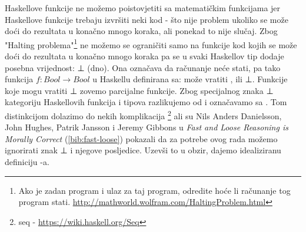   Haskellove funkcije ne možemo poistovjetiti sa matematičkim funkcijama jer
  Haskellove funkcije trebaju izvršiti neki kod - što nije problem ukoliko se
  može doći do rezultata u konačno mnogo koraka, ali ponekad to nije slučaj. Zbog "Halting
  problema"\footnote{Ako je zadan program i ulaz za taj program, odredite hoće
    li računanje tog program stati.
    \url{http://mathworld.wolfram.com/HaltingProblem.html}} ne možemo se
  ograničiti samo na funkcije kod kojih se može doći do rezultata u konačno
  mnogo koraka pa se u svaki Haskellov tip dodaje posebna vrijednost: ⊥ (dno).
  Ona označava da računanje neće stati, pa tako funkcija $f:
  Bool \to Bool$  u Haskellu definirana sa:
  može vratiti ,  ili ⊥. Funkcije koje mogu vratiti ⊥
  zovemo parcijalne funkcije.
  Zbog specijalnog znaka ⊥ kategoriju Haskellovih funkcija i tipova razlikujemo
  od  i označavamo sa . Tom distinkcijom dolazimo
  do nekih komplikacija \footnote{seq - \url{https://wiki.haskell.org/Seq}}
  ali su Nils Anders Danielsson, John Hughes, Patrik Jansson i Jeremy Gibbons
  u \textit{Fast and Loose Reasoning is Morally Correct} (\ref{bib:fast-loose}) pokazali
  da za potrebe ovog rada možemo ignorirati znak ⊥ i njegove posljedice. Uzevši to u obzir, dajemo idealiziranu definiciju -a.

